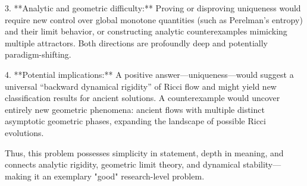 3. **Analytic and geometric difficulty:**  
   Proving or disproving uniqueness would require new control over global monotone quantities (such as Perelman’s entropy) and their limit behavior, or constructing analytic counterexamples mimicking multiple attractors. Both directions are profoundly deep and potentially paradigm-shifting.  

4. **Potential implications:**  
   A positive answer—uniqueness—would suggest a universal “backward dynamical rigidity” of Ricci flow and might yield new classification results for ancient solutions. A counterexample would uncover entirely new geometric phenomena: ancient flows with multiple distinct asymptotic geometric phases, expanding the landscape of possible Ricci evolutions.  

Thus, this problem possesses simplicity in statement, depth in meaning, and connects analytic rigidity, geometric limit theory, and dynamical stability—making it an exemplary "good" research-level problem.